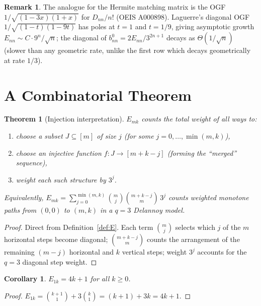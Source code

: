 \documentclass[11pt,a4paper]{article}
\theoremstyle{definition}
\newtheorem{remark}[definition]{Remark}
\theoremstyle{plain}
\newtheorem{theorem}[definition]{Theorem}
\newtheorem{corollary}[definition]{Corollary}
\begin{document}
\begin{remark}
The analogue for the Hermite matching matrix is the OGF
$1/\sqrt{(1-3x)(1+x)}$ for $D_{nn}/n!$ (OEIS A000898).
Laguerre's diagonal OGF $1/\sqrt{(1-t)(1-9t)}$ has poles at $t=1$ and
$t=1/9$, giving asymptotic growth $E_{nn}\sim C\cdot 9^n/\sqrt{n}$;
the diagonal of $b_{nn}^0 = 2E_{nn}/3^{2n+1}$ decays as
$\Theta(1/\sqrt{n})$ (slower than any geometric rate, unlike the first
row which decays geometrically at rate $1/3$).
\end{remark}

\section{A Combinatorial Theorem}

\begin{theorem}[Injection interpretation]\label{thm:inject}
$E_{mk}$ counts the total weight of all ways to:
\begin{enumerate}[label=(\roman*)]
  \item choose a subset $J\subseteq[m]$ of size $j$ (for some $j=0,\ldots,\min(m,k)$),
  \item choose an injective function $f\colon J\to[m+k-j]$ (forming the
        ``merged'' sequence),
  \item weight each such structure by $3^j$.
\end{enumerate}
Equivalently, $E_{mk} = \sum_{j=0}^{\min(m,k)}\binom{m}{j}\binom{m+k-j}{m}\,3^j$
counts \emph{weighted monotone paths} from $(0,0)$ to $(m,k)$ in a
$q=3$ Delannoy model.
\end{theorem}

\begin{proof}
Direct from Definition~\ref{def:E}. Each term $\binom{m}{j}$ selects
which $j$ of the $m$ horizontal steps become diagonal; $\binom{m+k-j}{m}$
counts the arrangement of the remaining $(m-j)$ horizontal and $k$
vertical steps; weight $3^j$ accounts for the $q=3$ diagonal step weight.
\end{proof}

\begin{corollary}
$E_{1k} = 4k+1$ for all $k\ge 0$.
\end{corollary}
\begin{proof}
$E_{1k} = \binom{k+1}{1} + 3\binom{k}{1} = (k+1)+3k = 4k+1$.
\end{proof}
\end{document}
